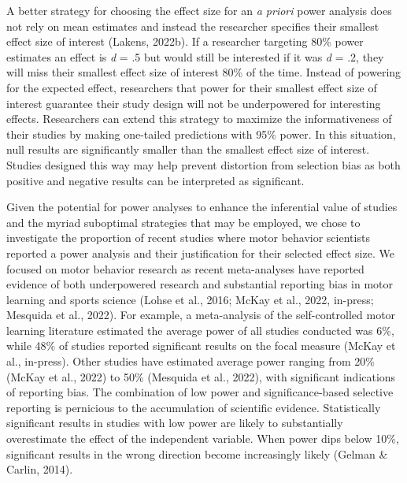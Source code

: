\documentclass[
  doc, donotrepeattitle,floatsintext]{apa7}
\begin{document}
A better strategy for choosing the effect size for an \emph{a priori} power analysis does not rely on mean estimates and instead the researcher specifies their smallest effect size of interest (Lakens, 2022b). If a researcher targeting 80\% power estimates an effect is \emph{d} = .5 but would still be interested if it was \emph{d} = .2, they will miss their smallest effect size of interest 80\% of the time. Instead of powering for the expected effect, researchers that power for their smallest effect size of interest guarantee their study design will not be underpowered for interesting effects. Researchers can extend this strategy to maximize the informativeness of their studies by making one-tailed predictions with 95\% power. In this situation, null results are significantly smaller than the smallest effect size of interest. Studies designed this way may help prevent distortion from selection bias as both positive and negative results can be interpreted as significant.

Given the potential for power analyses to enhance the inferential value of studies and the myriad suboptimal strategies that may be employed, we chose to investigate the proportion of recent studies where motor behavior scientists reported a power analysis and their justification for their selected effect size. We focused on motor behavior research as recent meta-analyses have reported evidence of both underpowered research and substantial reporting bias in motor learning and sports science (Lohse et al., 2016; McKay et al., 2022, in-press; Mesquida et al., 2022). For example, a meta-analysis of the self-controlled motor learning literature estimated the average power of all studies conducted was 6\%, while 48\% of studies reported significant results on the focal measure (McKay et al., in-press). Other studies have estimated average power ranging from 20\% (McKay et al., 2022) to 50\% (Mesquida et al., 2022), with significant indications of reporting bias. The combination of low power and significance-based selective reporting is pernicious to the accumulation of scientific evidence. Statistically significant results in studies with low power are likely to substantially overestimate the effect of the independent variable. When power dips below 10\%, significant results in the wrong direction become increasingly likely (Gelman \& Carlin, 2014).
\end{document}
